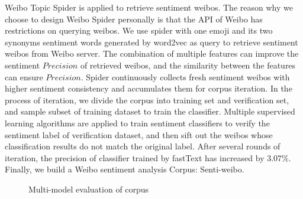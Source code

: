 \documentclass[runningheads]{llncs}
\begin{document}

Weibo Topic Spider is applied to retrieve sentiment weibos. The reason why we choose to design Weibo Spider personally is that the API of Weibo has restrictions on querying weibos. We use spider with one emoji and its two synonyms sentiment words generated by word2vec as query to retrieve sentiment weibos from Weibo server. The combination of multiple features can improve the sentiment $Precision$ of retrieved weibos, and the similarity between the features can ensure $Precision$. Spider continuously collects fresh sentiment weibos with higher sentiment consistency and accumulates them for corpus iteration. In the process of iteration, we divide the corpus into training set and verification set, and sample subset of training dataset to train the classifier. Multiple supervised learning algorithms are applied to train sentiment classifiers to verify the sentiment label of verification dataset, and then sift out the weibos whose classification results do not match the original label. After several rounds of iteration, the precision of classifier trained by fastText has increased by 3.07\%. Finally, we build a Weibo sentiment analysis Corpus: Senti-weibo. 

\begin{figure}[ht]
\vspace{-0.5cm}   %
\centering
{}
\caption{Multi-model evaluation of corpus}
\label{fig:corpus-evaluation}
\end{figure}
\end{document}
